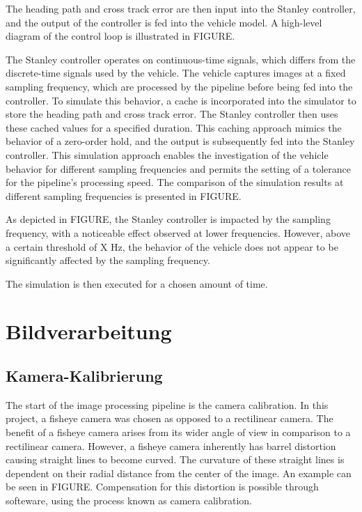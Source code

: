 \documentclass[arbeit=studie,oneside,BCOR=12mm]{ArbeitRST}
\begin{document}
The heading path and cross track error are then input into the Stanley
controller, and the output of the controller is fed into the vehicle model. A
high-level diagram of the control loop is illustrated in FIGURE.

The Stanley controller operates on continuous-time signals, which differs from
the discrete-time signals used by the vehicle. The vehicle captures images at a
fixed sampling frequency, which are processed by the pipeline before being fed
into the controller. To simulate this behavior, a cache is incorporated into
the simulator to store the heading path and cross track error. The Stanley
controller then uses these cached values for a specified duration. This caching
approach mimics the behavior of a zero-order hold, and the output is
subsequently fed into the Stanley controller. This simulation approach enables
the investigation of the vehicle behavior for different sampling frequencies
and permits the setting of a tolerance for the pipeline's processing speed. The
comparison of the simulation results at different sampling frequencies is
presented in FIGURE.

As depicted in FIGURE, the Stanley controller is impacted by the sampling
frequency, with a noticeable effect observed at lower frequencies. However,
above a certain threshold of X Hz, the behavior of the vehicle does not appear
to be significantly affected by the sampling frequency.

The simulation is then executed for a chosen amount of time. 

\chapter{Bildverarbeitung} 

\section{Kamera-Kalibrierung} 

The start of the image processing pipeline is the camera calibration. In this
project, a fisheye camera was chosen as opposed to a rectilinear camera. The
benefit of a fisheye camera arises from its wider angle of view in comparison
to a rectilinear camera. However, a fisheye camera inherently has barrel
distortion causing straight lines to become curved. The curvature of these
straight lines is dependent on their radial distance from the center of the
image. An example can be seen in FIGURE. Compensation for this distortion is
possible through softeware, using the process known as camera calibration. 
\end{document}
